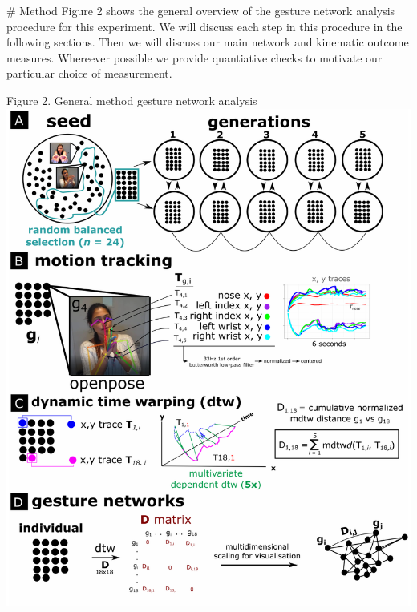 \documentclass[
  man, noextraspace,floatsintext]{apa6}
\begin{document}
\# Method
Figure 2 shows the general overview of the gesture network analysis procedure for this experiment. We will discuss each step in this procedure in the following sections. Then we will discuss our main network and kinematic outcome measures. Whereever possible we provide quantiative checks to motivate our particular choice of measurement.

\pagebreak

Figure 2. General method gesture network analysis
\includegraphics{GNet_WP_files/figure-latex/plotmainmethodfigure-1.pdf}
\end{document}

